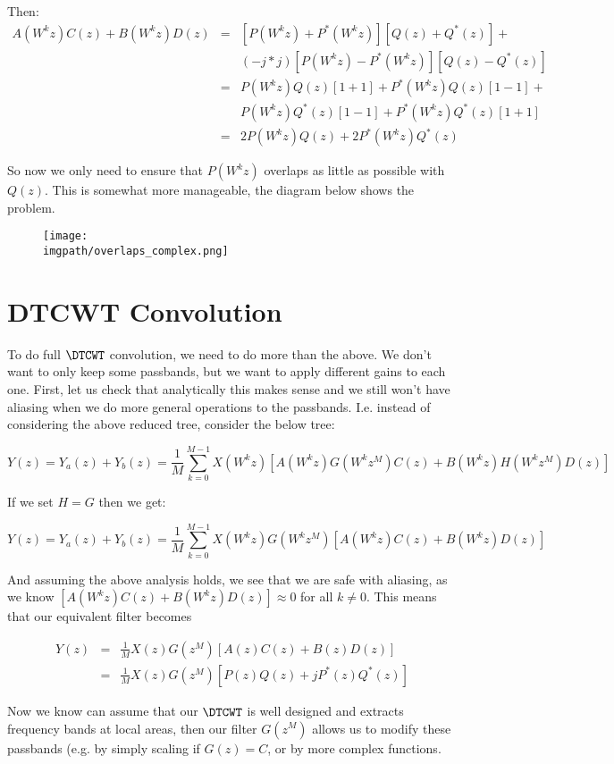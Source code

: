 Then:
\begin{eqnarray}
A(W^kz)C(z) + B(W^kz)D(z) &=&  [P(W^kz) + P^*(W^kz)][Q(z) + Q^*(z)] + \nonumber \\
  && (-j*j)[P(W^kz) - P^*(W^kz)][Q(z) - Q^*(z)] \\
&=& P(W^kz)Q(z)[1+1] + P^*(W^kz)Q(z)[1-1] + \nonumber \\ 
  && P(W^kz)Q^*(z)[1-1] + P^*(W^kz)Q^*(z)[1+1] \\
&=& 2P(W^kz)Q(z) + 2P^*(W^kz)Q^*(z)
\end{eqnarray}

So now we only need to ensure that $P(W^kz)$ overlaps as little as possible with
$Q(z)$. This is somewhat more manageable, the diagram below shows the problem.

\begin{figure}
  \texttt{[image: \\imgpath/overlaps\_complex.png]}
\end{figure}


\section{DTCWT Convolution}
To do full $\DTCWT$ convolution, we need to do more than the above. We don't
want to only keep some passbands, but we want to apply different gains to each
one. First, let us check that analytically this makes sense and we still won't
have aliasing when we do more general operations to the passbands. I.e. instead
of considering the above reduced tree, consider the below tree:

$$Y(z) = Y_{a}(z) + Y_{b}(z) = \frac{1}{M} \sum_{k=0}^{M-1} X(W^k z) [A(W^kz)G(W^kz^{M})C(z) + B(W^kz)H(W^kz^{M})D(z)]$$

If we set $H=G$ then we get:

$$Y(z) = Y_{a}(z) + Y_{b}(z) = \frac{1}{M} \sum_{k=0}^{M-1} X(W^k z)G(W^kz^{M}) [A(W^kz)C(z) + B(W^kz)D(z)]$$

And assuming the above analysis holds, we see that we are safe with aliasing, as
we know $[A(W^kz)C(z) + B(W^kz)D(z)] \approx 0$ for all $k\neq 0$. This means
that our equivalent filter becomes

\begin{eqnarray}
  Y(z) &=& \frac{1}{M} X(z)G(z^{M}) [A(z)C(z) + B(z)D(z)] \\
  &=& \frac{1}{M} X(z)G(z^{M}) [P(z)Q(z) + jP^{*}(z)Q^{*}(z)]
\end{eqnarray}

Now we know can assume that our $\DTCWT$ is well designed and extracts frequency
bands at local areas, then our filter $G(z^{M})$ allows us to modify these
passbands (e.g. by simply scaling if $G(z) = C$, or by more complex functions.


